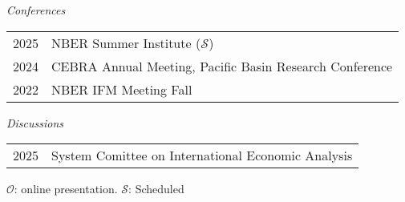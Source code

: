 \documentclass[10pt]{article}
\begin{document}
\noindent \emph{Conferences}\\[0.1in]
\begin{tabular}{@{}p{1.8cm}p{13cm}}
2025 & NBER Summer Institute ($\mathcal{S}$)\\
2024 & CEBRA Annual Meeting, Pacific Basin Research Conference\\
2022& NBER IFM Meeting Fall
\end{tabular}

\noindent \emph{Discussions}\\[0.1in]
\begin{tabular}{@{}p{1.8cm}p{13cm}}
2025 &System Comittee on International Economic Analysis
\end{tabular}


{\footnotesize $\mathcal{O}$: online presentation. $\mathcal{S}$: Scheduled}









%
%
%
\end{document}
